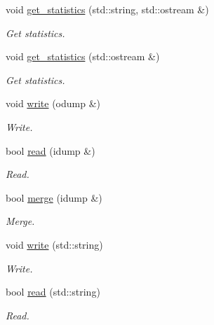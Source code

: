 \begin{CompactItemize}
\item 
void \hyperlink{classmeasurements_0d0e8ac163265e3a02ca83e150221ed4}{get\_\-statistics} (std::string, std::ostream \&)
\begin{CompactList}\small\item\em Get statistics. \item\end{CompactList}\item 
void \hyperlink{classmeasurements_e6a871ac853fd836b49b56cb0ef5c70c}{get\_\-statistics} (std::ostream \&)
\begin{CompactList}\small\item\em Get statistics. \item\end{CompactList}\item 
void \hyperlink{classmeasurements_26690b08604d461717312270d40021d4}{write} (odump \&)
\begin{CompactList}\small\item\em Write. \item\end{CompactList}\item 
bool \hyperlink{classmeasurements_16b99ed7218f85ecf1494519d155d9ab}{read} (idump \&)
\begin{CompactList}\small\item\em Read. \item\end{CompactList}\item 
bool \hyperlink{classmeasurements_5a0d8032fe5c156ed577b637e4cde3c3}{merge} (idump \&)
\begin{CompactList}\small\item\em Merge. \item\end{CompactList}\item 
void \hyperlink{classmeasurements_396460ca67c99ae0fc99c5a5fe52e472}{write} (std::string)
\begin{CompactList}\small\item\em Write. \item\end{CompactList}\item 
bool \hyperlink{classmeasurements_56f0c9b4ebd6f87795402c24011f1388}{read} (std::string)
\begin{CompactList}\small\item\em Read. \item\end{CompactList}\item 

\end{CompactItemize}

